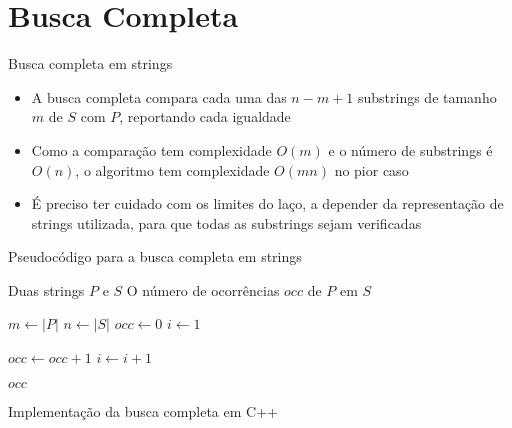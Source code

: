 \section{Busca Completa}


\begin{frame}[fragile]{Busca completa em strings}

    \begin{itemize}
        \item A busca completa compara cada uma das $n - m + 1$ substrings de tamanho $m$ de $S$ 
            com $P$, reportando cada igualdade
        \pause

        \item Como a comparação tem complexidade $O(m)$ e o número de substrings é $O(n)$, o 
            algoritmo tem complexidade $O(mn)$ no pior caso
        \pause

        \item É preciso ter cuidado com os limites do laço, a depender da representação de 
            strings utilizada, para que todas as substrings sejam verificadas
    \end{itemize}

\end{frame}

\begin{frame}[fragile]{Pseudocódigo para a busca completa em strings}

    \begin{algorithm}[H]
        \caption{Busca completa em Strings}
        \begin{algorithmic}[1]
            \Require Duas strings $P$ e $S$
            \Ensure O número de ocorrências $occ$ de $P$ em $S$

                \State $m \gets |P|$
                \State $n \gets |S|$
                \State $occ \gets 0$
                \State $i \gets 1$

                        \State $occ \gets occ + 1$
                    \EndIf
                    \State $i \gets i + 1$
                \EndWhile

                \State \Return $occ$
            \EndFunction
        \end{algorithmic}
    \end{algorithm}

\end{frame}


\begin{frame}[fragile]{Implementação da busca completa em C++}
\end{frame}

